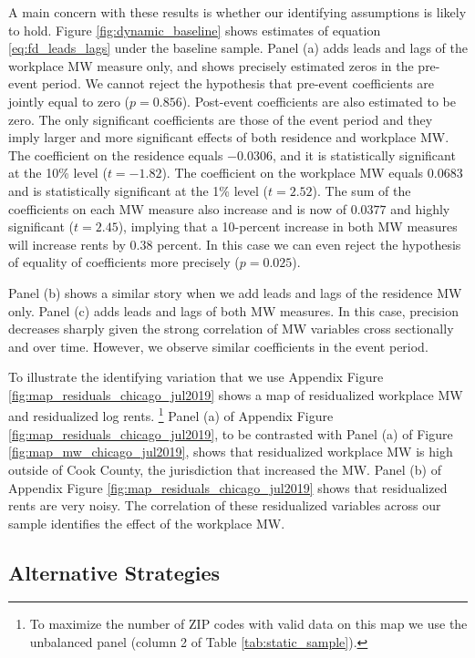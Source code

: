 A main concern with these results is whether our identifying assumptions is 
likely to hold.
Figure \ref{fig:dynamic_baseline} shows estimates of equation 
\eqref{eq:fd_leads_lags} under the baseline sample.
Panel (a) adds leads and lags of the workplace MW measure only, and shows
precisely estimated zeros in the pre-event period.
We cannot reject the hypothesis that pre-event coefficients are jointly equal
to zero ($p = 0.856$).
Post-event coefficients are also estimated to be zero.
The only significant coefficients are those of the event period and they imply 
larger and more significant effects of both residence and workplace MW.
The coefficient on the residence equals $-0.0306$, and it is 
statistically significant at the 10\% level ($t=-1.82$).
The coefficient on the workplace MW equals $0.0683$ and is 
statistically significant at the 1\% level ($t=2.52$).
The sum of the coefficients on each MW measure also increase and is now of
$0.0377$ and highly significant ($t=2.45$), implying that a 10-percent increase 
in both MW measures will increase rents by $0.38$ percent.
In this case we can even reject the hypothesis of equality of coefficients more
precisely ($p = 0.025$).

Panel (b) shows a similar story when we add leads and lags of the residence MW
only.
Panel (c) adds leads and lags of both MW measures.
In this case, precision decreases sharply given the strong correlation of 
MW variables cross sectionally and over time. However, we observe similar 
coefficients in the event period.

To illustrate the identifying variation that we use 
Appendix Figure \ref{fig:map_residuals_chicago_jul2019} shows a map of 
residualized workplace MW and residualized log rents.%
\footnote{To maximize the number of ZIP codes with valid data on this map we
use the unbalanced panel (column 2 of Table \ref{tab:static_sample}).}
Panel (a) of Appendix Figure \ref{fig:map_residuals_chicago_jul2019}, to be 
contrasted with Panel (a) of Figure \ref{fig:map_mw_chicago_jul2019}, 
shows that residualized workplace MW is high outside of Cook County, the 
jurisdiction that increased the MW.
Panel (b) of Appendix Figure \ref{fig:map_residuals_chicago_jul2019} shows that 
residualized rents are very noisy.
The correlation of these residualized variables across our sample identifies
the effect of the workplace MW.

\subsection{Alternative Strategies}

